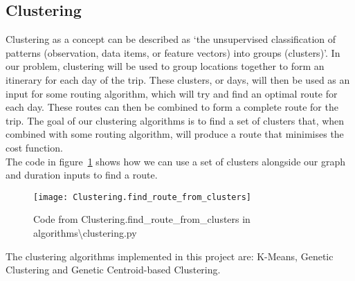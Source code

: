 
\subsection{Clustering}\label{subsec:clustering}
Clustering as a concept can be described as `the unsupervised classification of patterns (observation, data items, or
feature vectors) into groups (clusters)'.
In our problem, clustering will be used to group locations together to form an itinerary for each day of the trip.
These clusters, or days, will then be used as an input for some routing algorithm, which will try and find an
optimal route for each day.
These routes can then be combined to form a complete route for the trip.
The goal of our clustering algorithms is to find a set of clusters that, when combined with some routing algorithm,
will produce a route that minimises the cost function.\\
The code in figure~\ref{fig:Clustering.find_route_from_clusters} shows how we can use a set of clusters alongside our
graph and duration inputs to find a route.
\begin{figure}[H]
    \centering
    \texttt{[image: Clustering.find\_route\_from\_clusters]}
    \caption{Code from Clustering.find\_route\_from\_clusters in algorithms\textbackslash clustering.py}
    \label{fig:Clustering.find_route_from_clusters}
\end{figure}

\noindent
The clustering algorithms implemented in this project are: K-Means, Genetic Clustering and Genetic Centroid-based
Clustering.

